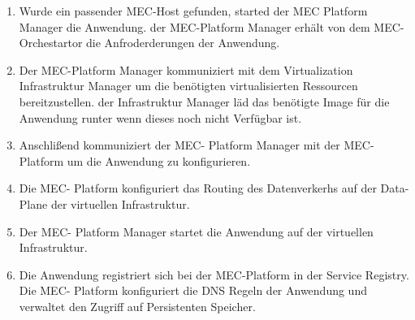 \documentclass[runningheads]{llncs}
\numberwithin{figure}{section}
\begin{document}
\begin{enumerate}
  \item Wurde ein passender MEC-Host gefunden, started der MEC Platform Manager die Anwendung. der MEC-Platform Manager erhält von dem 
  MEC-Orchestartor die Anfroderderungen der Anwendung.
  \item Der MEC-Platform Manager kommuniziert mit dem Virtualization Infrastruktur Manager um die benötigten virtualisierten Ressourcen 
  bereitzustellen. der Infrastruktur Manager läd das benötigte Image für die Anwendung runter wenn dieses noch nicht Verfügbar ist.
  \item Anschlißend kommuniziert der MEC- Platform Manager mit der MEC- Platform um die Anwendung zu konfigurieren.
  \item Die MEC- Platform konfiguriert das Routing des Datenverkerhs auf der Data-Plane der virtuellen Infrastruktur.
  \item Der MEC- Platform Manager startet die Anwendung auf der virtuellen Infrastruktur.
  \item Die Anwendung registriert sich bei der MEC-Platform in der Service Registry. Die MEC- Platform konfiguriert die DNS Regeln der 
  Anwendung und verwaltet den Zugriff auf Persistenten Speicher.
\end{enumerate}

\newpage
\end{document}
